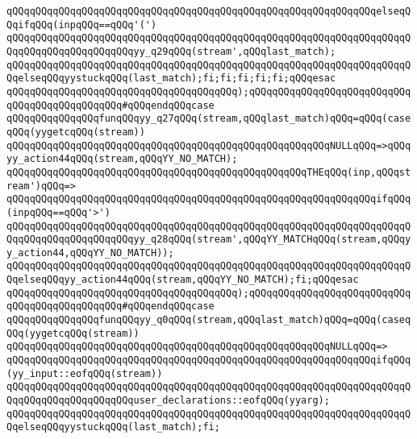 \verb|qQQqqQQqqQQqqQQqqQQqqQQqqQQqqQQqqQQqqQQqqQQqqQQqqQQqqQQqqQQqqQQqelseqQQqifqQQq(inpqQQq==qQQq'(')|\newline
\verb|qQQqqQQqqQQqqQQqqQQqqQQqqQQqqQQqqQQqqQQqqQQqqQQqqQQqqQQqqQQqqQQqqQQqqQQqqQQqqQQqqQQqqQQqqQQqyy_q29qQQq(stream',qQQqlast_match);|\newline
\verb|qQQqqQQqqQQqqQQqqQQqqQQqqQQqqQQqqQQqqQQqqQQqqQQqqQQqqQQqqQQqqQQqqQQqqQQqelseqQQqyystuckqQQq(last_match);fi;fi;fi;fi;fi;qQQqesac|\newline
\verb|qQQqqQQqqQQqqQQqqQQqqQQqqQQqqQQqqQQqqQQq);qQQqqQQqqQQqqQQqqQQqqQQqqQQqqQQqqQQqqQQqqQQqqQQq#qQQqendqQQqcase|\newline
\verb|qQQqqQQqqQQqqQQqfunqQQqyy_q27qQQq(stream,qQQqlast_match)qQQq=qQQq(caseqQQq(yygetcqQQq(stream))|\newline
\verb|qQQqqQQqqQQqqQQqqQQqqQQqqQQqqQQqqQQqqQQqqQQqqQQqqQQqqQQqNULLqQQq=>qQQqyy_action44qQQq(stream,qQQqYY_NO_MATCH);|\newline
\verb|qQQqqQQqqQQqqQQqqQQqqQQqqQQqqQQqqQQqqQQqqQQqqQQqqQQqTHEqQQq(inp,qQQqstream')qQQq=>|\newline
\verb|qQQqqQQqqQQqqQQqqQQqqQQqqQQqqQQqqQQqqQQqqQQqqQQqqQQqqQQqqQQqqQQqifqQQq(inpqQQq==qQQq'>')|\newline
\verb|qQQqqQQqqQQqqQQqqQQqqQQqqQQqqQQqqQQqqQQqqQQqqQQqqQQqqQQqqQQqqQQqqQQqqQQqqQQqqQQqqQQqqQQqqQQqyy_q28qQQq(stream',qQQqYY_MATCHqQQq(stream,qQQqyy_action44,qQQqYY_NO_MATCH));|\newline
\verb|qQQqqQQqqQQqqQQqqQQqqQQqqQQqqQQqqQQqqQQqqQQqqQQqqQQqqQQqqQQqqQQqqQQqqQQqelseqQQqyy_action44qQQq(stream,qQQqYY_NO_MATCH);fi;qQQqesac|\newline
\verb|qQQqqQQqqQQqqQQqqQQqqQQqqQQqqQQqqQQqqQQq);qQQqqQQqqQQqqQQqqQQqqQQqqQQqqQQqqQQqqQQqqQQqqQQq#qQQqendqQQqcase|\newline
\verb|qQQqqQQqqQQqqQQqfunqQQqyy_q0qQQq(stream,qQQqlast_match)qQQq=qQQq(caseqQQq(yygetcqQQq(stream))|\newline
\verb|qQQqqQQqqQQqqQQqqQQqqQQqqQQqqQQqqQQqqQQqqQQqqQQqqQQqqQQqNULLqQQq=>|\newline
\verb|qQQqqQQqqQQqqQQqqQQqqQQqqQQqqQQqqQQqqQQqqQQqqQQqqQQqqQQqqQQqqQQqifqQQq(yy_input::eofqQQq(stream))|\newline
\verb|qQQqqQQqqQQqqQQqqQQqqQQqqQQqqQQqqQQqqQQqqQQqqQQqqQQqqQQqqQQqqQQqqQQqqQQqqQQqqQQqqQQqqQQqqQQquser_declarations::eofqQQq(yyarg);|\newline
\verb|qQQqqQQqqQQqqQQqqQQqqQQqqQQqqQQqqQQqqQQqqQQqqQQqqQQqqQQqqQQqqQQqqQQqqQQqelseqQQqyystuckqQQq(last_match);fi;|\newline
